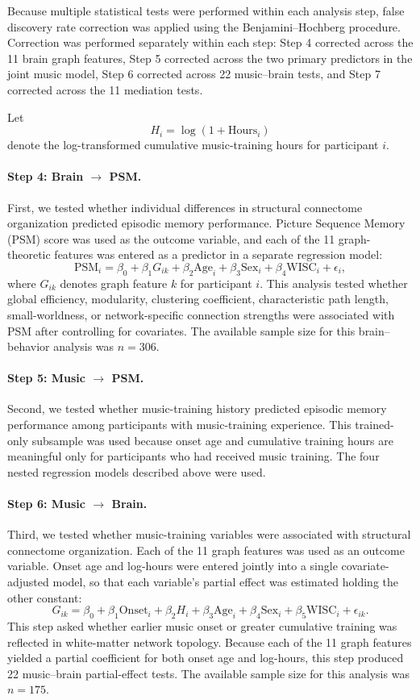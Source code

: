 \documentclass[11pt]{article}
\begin{document}
Because multiple statistical tests were performed within each analysis step, false discovery rate correction was applied using the Benjamini--Hochberg procedure. Correction was performed separately within each step: Step 4 corrected across the 11 brain graph features, Step 5 corrected across the two primary predictors in the joint music model, Step 6 corrected across 22 music--brain tests, and Step 7 corrected across the 11 mediation tests.

Let
\[
H_i
=
\log\left(1+\mathrm{Hours}_i\right)
\]
denote the log-transformed cumulative music-training hours for participant $i$.

\paragraph{Step 4: Brain $\rightarrow$ PSM.}
First, we tested whether individual differences in structural connectome organization predicted episodic memory performance. Picture Sequence Memory (PSM) score was used as the outcome variable, and each of the 11 graph-theoretic features was entered as a predictor in a separate regression model:
\[
\mathrm{PSM}_i
=
\beta_0
+
\beta_1 G_{ik}
+
\beta_2 \mathrm{Age}_i
+
\beta_3 \mathrm{Sex}_i
+
\beta_4 \mathrm{WISC}_i
+
\epsilon_i,
\]
where $G_{ik}$ denotes graph feature $k$ for participant $i$. This analysis tested whether global efficiency, modularity, clustering coefficient, characteristic path length, small-worldness, or network-specific connection strengths were associated with PSM after controlling for covariates. The available sample size for this brain--behavior analysis was $n=306$.

\paragraph{Step 5: Music $\rightarrow$ PSM.}
Second, we tested whether music-training history predicted episodic memory performance among participants with music-training experience. This trained-only subsample was used because onset age and cumulative training hours are meaningful only for participants who had received music training. The four nested regression models described above were used.


\paragraph{Step 6: Music $\rightarrow$ Brain.}
Third, we tested whether music-training variables were associated with structural connectome organization. Each of the 11 graph features was used as an outcome variable. Onset age and log-hours were entered jointly into a single covariate-adjusted model, so that each variable's partial effect was estimated holding the other constant:
\[
G_{ik}
=
\beta_0
+
\beta_1 \mathrm{Onset}_i
+
\beta_2 H_i
+
\beta_3 \mathrm{Age}_i
+
\beta_4 \mathrm{Sex}_i
+
\beta_5 \mathrm{WISC}_i
+
\epsilon_{ik}.
\]
This step asked whether earlier music onset or greater cumulative training was reflected in white-matter network topology. Because each of the 11 graph features yielded a partial coefficient for both onset age and log-hours, this step produced 22 music--brain partial-effect tests. The available sample size for this analysis was $n=175$.
\end{document}

